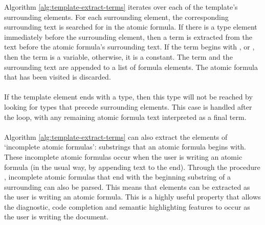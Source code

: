 \documentclass[../main.tex]{subfiles}
\begin{document}
Algorithm \ref{alg:template-extract-terms} iterates over each of the template's surrounding elements. For each surrounding element, the corresponding surrounding text is searched for in the atomic formula. If there is a type element immediately before the surrounding element, then a term is extracted from the text before the atomic formula's surrounding text. If the term begins with ,  or , then the term is a variable, otherwise, it is a constant. The term and the surrounding text are appended to a list of formula elements. The atomic formula that has been visited is discarded.
\\
\\
If the template element ends with a type, then this type will not be reached by looking for types that precede surrounding elements. This case is handled after the loop, with any remaining atomic formula text interpreted as a final term.
\\
\\
Algorithm \ref{alg:template-extract-terms} can also extract the elements of `incomplete atomic formulas': substrings that an atomic formula begins with. These incomplete atomic formulas occur when the user is writing an atomic formula (in the usual way, by appending text to the end). Through the procedure , incomplete atomic formulas that end with the beginning substring of a surrounding can also be parsed. This means that elements can be extracted as the user is writing an atomic formula. This is a highly useful property that allows the diagnostic, code completion and semantic highlighting features to occur as the user is writing the document.
\end{document}
